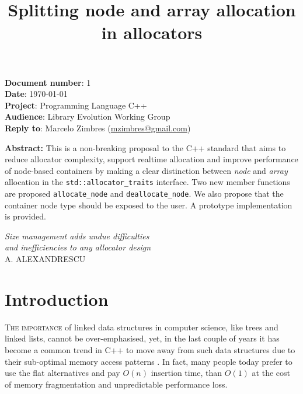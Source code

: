 \documentclass[11pt]{article}
\begin{document}
\date{}
\title{\bf Splitting node and array allocation in allocators}
\maketitle
\noindent
{\bf Document number}:  1 \\
{\bf Date}:  \today \\
{\bf Project}: Programming Language C++ \\
{\bf Audience}: Library Evolution Working Group \\
{\bf Reply to}: Marcelo Zimbres (\href{mailto:mzimbres@gmail.com}{mzimbres@gmail.com}) 

\vspace{1cm}

\noindent
{\bf Abstract: }This is a non-breaking proposal to the C++ standard that aims
to reduce allocator complexity, support realtime allocation and improve
performance of node-based containers by making a clear distinction between {\it node}
and {\it array} allocation in the \texttt{std::allocator\_traits} interface.
Two new member functions are proposed \texttt{allocate\_node} and
\texttt{deallocate\_node}. We also propose that the container node type should
be exposed to the user. A prototype implementation is provided.

\vfill
\begin{flushright}
\noindent
{\it Size management adds undue difficulties \\
     and inefficiencies to any allocator design} \\
A. ALEXANDRESCU \\
\medskip
{\it }
\end{flushright}
\medskip

\newpage
\tableofcontents

\newpage
\section{Introduction}
\textsc{The importance} of linked data structures in computer science, like
trees and linked lists, cannot be over-emphasised, yet, in the last couple of
years it has become a common trend in C++ to move away from such data
structures due to their sub-optimal memory access patterns \cite{middleditch,
chandler, meyers}.  In fact, many people today prefer to use the flat
alternatives and pay $O(n)$ insertion time, than $O(1)$ at the cost of memory
fragmentation and unpredictable performance loss.  
\end{document}
